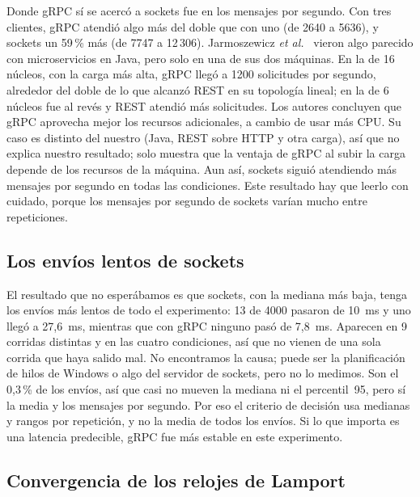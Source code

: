Donde gRPC sí se acercó a sockets fue en los mensajes por segundo. Con tres clientes, gRPC atendió algo más del doble que con uno (de 2640 a 5636), y sockets un 59\,\% más (de 7747 a 12\,306). Jarmoszewicz \emph{et al.}~\cite{Jarmoszewicz2024} vieron algo parecido con microservicios en Java, pero solo en una de sus dos máquinas. En la de 16 núcleos, con la carga más alta, gRPC llegó a 1200 solicitudes por segundo, alrededor del doble de lo que alcanzó REST en su topología lineal; en la de 6 núcleos fue al revés y REST atendió más solicitudes. Los autores concluyen que gRPC aprovecha mejor los recursos adicionales, a cambio de usar más CPU. Su caso es distinto del nuestro (Java, REST sobre HTTP y otra carga), así que no explica nuestro resultado; solo muestra que la ventaja de gRPC al subir la carga depende de los recursos de la máquina. Aun así, sockets siguió atendiendo más mensajes por segundo en todas las condiciones. Este resultado hay que leerlo con cuidado, porque los mensajes por segundo de sockets varían mucho entre repeticiones.

\subsection{Los envíos lentos de sockets}

El resultado que no esperábamos es que sockets, con la mediana más baja, tenga los envíos más lentos de todo el experimento: 13 de 4000 pasaron de 10~ms y uno llegó a 27,6~ms, mientras que con gRPC ninguno pasó de 7,8~ms. Aparecen en 9 corridas distintas y en las cuatro condiciones, así que no vienen de una sola corrida que haya salido mal. No encontramos la causa; puede ser la planificación de hilos de Windows o algo del servidor de sockets, pero no lo medimos. Son el 0,3\,\% de los envíos, así que casi no mueven la mediana ni el percentil~95, pero sí la media y los mensajes por segundo. Por eso el criterio de decisión usa medianas y rangos por repetición, y no la media de todos los envíos. Si lo que importa es una latencia predecible, gRPC fue más estable en este experimento.

\subsection{Convergencia de los relojes de Lamport}
\label{sec:discusion-lamport}

